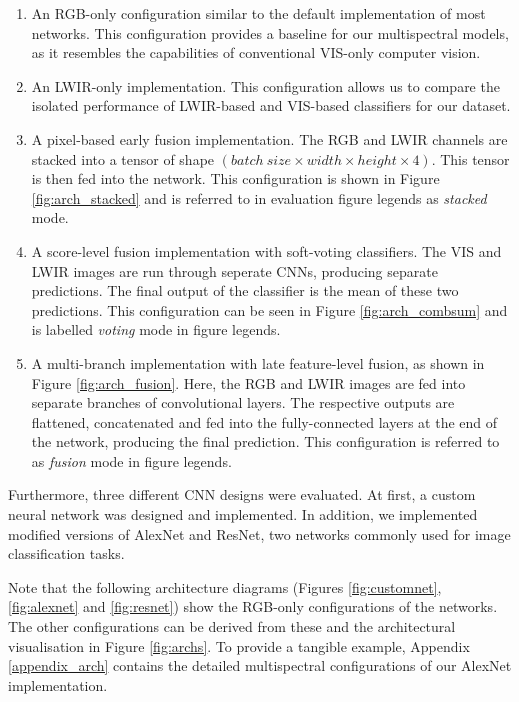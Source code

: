 \documentclass{l4proj}
\begin{document}
\begin{enumerate}
  \item An RGB-only configuration similar to the default implementation of most networks. This configuration provides a baseline for our multispectral models, as it resembles the capabilities of conventional VIS-only computer vision.
  \item An LWIR-only implementation. This configuration allows us to compare the isolated performance of LWIR-based and VIS-based classifiers for our dataset.
  \item A pixel-based early fusion implementation. The RGB and LWIR channels are stacked into a tensor of shape $({batch\ size} \times width \times height \times 4)$. This tensor is then fed into the network. This configuration is shown in Figure \ref{fig:arch_stacked} and is referred to in evaluation figure legends as \textit{stacked} mode.
  \item A score-level fusion implementation with soft-voting classifiers. The VIS and LWIR images are run through seperate CNNs, producing separate predictions. The final output of the classifier is the mean of these two predictions. This configuration can be seen in Figure \ref{fig:arch_combsum} and is labelled \textit{voting} mode in figure legends.
  \item A multi-branch implementation with late feature-level fusion, as shown in Figure \ref{fig:arch_fusion}. Here, the RGB and LWIR images are fed into separate branches of convolutional layers. The respective outputs are flattened, concatenated and fed into the fully-connected layers at the end of the network, producing the final prediction. This configuration is referred to as \textit{fusion} mode in figure legends.
\end{enumerate}

Furthermore, three different CNN designs were evaluated. At first, a custom neural network was designed and implemented. In addition, we implemented modified versions of AlexNet and ResNet, two networks commonly used for image classification tasks. 

Note that the following architecture diagrams (Figures \ref{fig:customnet}, \ref{fig:alexnet} and \ref{fig:resnet}) show the RGB-only configurations of the networks. The other configurations can be derived from these and the architectural visualisation in Figure \ref{fig:archs}. To provide a tangible example, Appendix \ref{appendix_arch} contains the detailed multispectral configurations of our AlexNet implementation.
\end{document}
